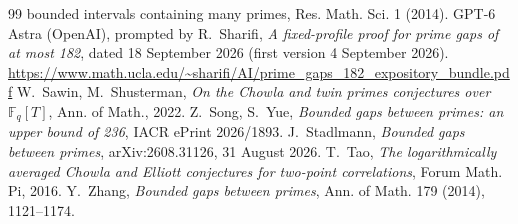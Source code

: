 \documentclass[11pt]{amsart}
\theoremstyle{definition}
\theoremstyle{remark}
\begin{document}
\begin{thebibliography}{99}
{bounded intervals containing many primes}, Res. Math. Sci. 1 (2014).
 GPT-6 Astra (OpenAI), prompted by R.~Sharifi, \emph{A
fixed-profile proof for prime gaps of at most 182}, dated 18 September 2026
(first version 4 September 2026).
\url{https://www.math.ucla.edu/~sharifi/AI/prime_gaps_182_expository_bundle.pdf}
 W.~Sawin, M.~Shusterman, \emph{On the Chowla and twin primes
conjectures over $\mathbb F_q[T]$}, Ann. of Math., 2022.
 Z.~Song, S.~Yue, \emph{Bounded gaps between primes: an upper
bound of 236}, IACR ePrint 2026/1893.
 J.~Stadlmann, \emph{Bounded gaps between primes},
arXiv:2608.31126, 31 August 2026.
 T.~Tao, \emph{The logarithmically averaged Chowla and Elliott
conjectures for two-point correlations}, Forum Math. Pi, 2016.
 Y.~Zhang, \emph{Bounded gaps between primes}, Ann. of Math.
179 (2014), 1121--1174.
\end{thebibliography}
\end{document}
